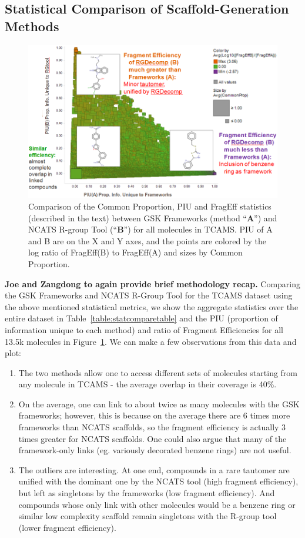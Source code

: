 \documentclass[journal=jacsat,manuscript=article]{achemso}
\newcommand*\fref[1]{Figure~\ref{fig:#1}}
\newcommand*\tref[1]{Table~\ref{table:#1}}
\begin{document}
\subsection{Statistical Comparison of Scaffold-Generation Methods}
\begin{figure}
\includegraphics[width=6in]{fig/statcompare_frames_RGtool.png}
\caption{Comparison of the Common Proportion, PIU and FragEff statistics (described in the text) between GSK Frameworks (method ``{\bf A}'') and NCATS R-group Tool (``{\bf B}'') for all molecules in TCAMS. PIU of A and B are on the X and Y axes, and the points are colored by the log ratio of FragEff(B) to FragEff(A) and sizes by Common Proportion.}
\label{fig:statcompare}
\end{figure}
 
\textbf{Joe and Zangdong to again provide brief methodology recap.}
Comparing the GSK Frameworks and NCATS R-Group Tool for the TCAMS dataset using the above mentioned statistical metrics, we show the aggregate statistics over the entire dataset in \tref{statcomparetable} and the PIU (proportion of information unique to each method) and ratio of Fragment Efficiencies for all 13.5k molecules in \fref{statcompare}. We can make a few observations from this data and plot:
\begin{enumerate} 
\item The two methods allow one to access different sets of molecules starting from any molecule in TCAMS - the average overlap in their coverage is 40\%.
\item On the average, one can link to about twice as many molecules with the GSK frameworks; however, this is because on the average there are 6 times more frameworks than NCATS scaffolds, so the fragment efficiency is actually 3 times greater for NCATS scaffolds. One could also argue that many of the framework-only links (eg. variously decorated benzene rings) are not useful.
\item The outliers are interesting. At one end, compounds in a rare tautomer are unified with the dominant one by the NCATS tool (high fragment efficiency), but left as singletons by the frameworks (low fragment efficiency). And compounds whose only link with other molecules would be a benzene ring or similar low complexity scaffold remain singletons with the R-group tool (lower fragment efficiency).
\end{enumerate}
\end{document}
